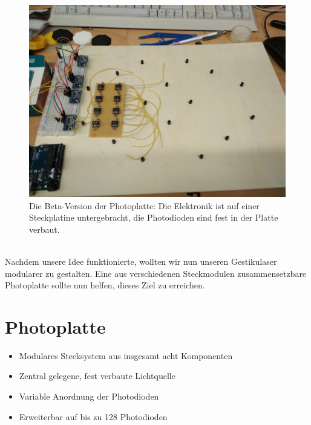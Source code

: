 \documentclass{sciposter}
\begin{document}
\begin{multicols}{3}
\begin{figure}[h]
	\centering
	\includegraphics[scale=0.35]{../figures/PhotoplatteBeta.jpeg}
	\caption{Die Beta-Version der Photoplatte: Die Elektronik ist auf einer Steckplatine untergebracht, die Photodioden sind fest in der Platte verbaut.}
	\label{fig:PhotoplatteBeta}
\end{figure} \\
\noindent
Nachdem unsere Idee funktionierte, wollten wir nun unseren Gestikulaser modularer zu gestalten. Eine aus verschiedenen Steckmodulen zusammensetzbare Photoplatte sollte nun helfen, dieses Ziel zu erreichen.


\section{Photoplatte}
\noindent

\begin{itemize}
	\item Modulares Stecksystem aus insgesamt acht Komponenten
	\item Zentral gelegene, fest verbaute Lichtquelle
	\item Variable Anordnung der Photodioden
	\item Erweiterbar auf bis zu 128 Photodioden
\end{itemize}


\end{multicols}
\end{document}
